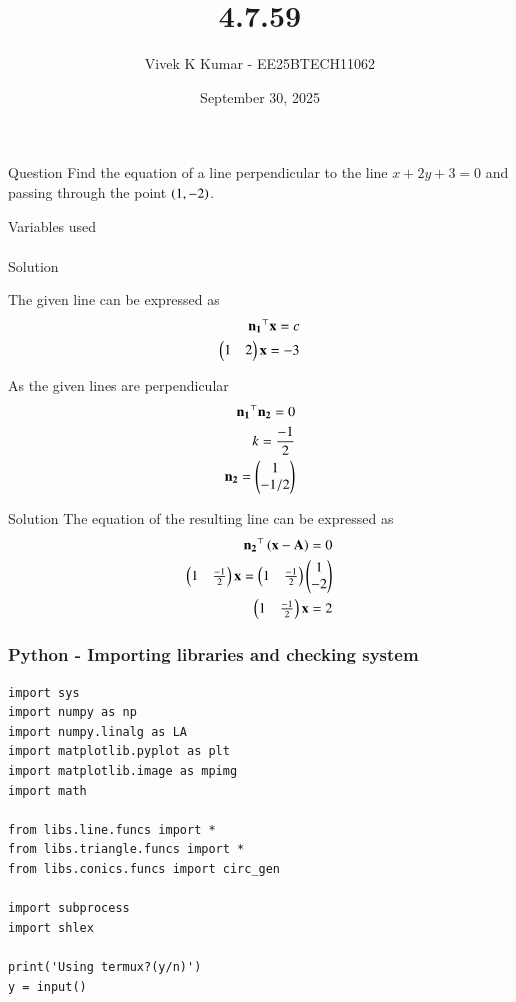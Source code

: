 \documentclass{beamer}
\title 
{4.7.59}
\date{September 30, 2025}
\author 
{Vivek K Kumar - EE25BTECH11062}
\begin{document}
\frame{\titlepage}
\begin{frame}{Question}
Find the equation of a line perpendicular to the line $x + 2y + 3 = 0$ and passing
through the point $\left(1, -2\right)$.
\end{frame}

\begin{frame}{Variables used}
\begin{align}
\end{align}
\begin{table}[H]    
  \centering
  
  \caption{Variables used}
  \label{tab:4.7.59}
\end{table}

\end{frame}

\begin{frame}{Solution}

The given line can be expressed as 
\begin{align}
    \mathbf{n_1}^\top \mathbf{x} = c \\
    \begin{pmatrix}1 & 2\end{pmatrix}\mathbf{x} = -3\\
\end{align}

As the given lines are perpendicular
\begin{align}
    \mathbf{n_1}^\top \mathbf{n_2} = 0 \\
    k = \frac{-1}{2}\\
    \mathbf{n_2} = \begin{pmatrix}1 \\ -1/2\end{pmatrix}
\end{align}
\end{frame}

\begin{frame}{Solution}
The equation of the resulting line can be expressed as
\begin{align}
    \mathbf{n_2}^\top\left(\mathbf{x} - \mathbf{A}\right) = 0\\
    \begin{pmatrix}1 & \frac{-1}{2}\end{pmatrix}\mathbf{x} = \begin{pmatrix}1 & \frac{-1}{2}\end{pmatrix}\begin{pmatrix}1 \\ -2\end{pmatrix}\\
    \begin{pmatrix}1 & \frac{-1}{2}\end{pmatrix}\mathbf{x} = 2
\end{align}
\end{frame}

\begin{frame}[fragile]
    \frametitle{Python - Importing libraries and checking system}
    \begin{lstlisting}
import sys
import numpy as np
import numpy.linalg as LA
import matplotlib.pyplot as plt
import matplotlib.image as mpimg
import math

from libs.line.funcs import *
from libs.triangle.funcs import *
from libs.conics.funcs import circ_gen

import subprocess
import shlex

print('Using termux?(y/n)')
y = input()
\end{lstlisting}
\end{frame}
\end{document}
